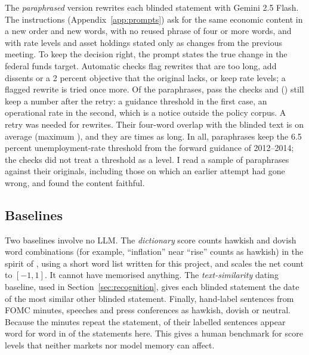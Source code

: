 The \emph{paraphrased} version rewrites each blinded statement with Gemini 2.5 Flash. The instructions
(Appendix~\ref{app:prompts}) ask for the same economic content in a new order and new words, with no
reused phrase of four or more words, and with rate levels and asset holdings stated only as changes from
the previous meeting. To keep the decision right, the prompt states the true change in the federal funds
target. Automatic checks flag rewrites that are too long, add dissents or a 2 percent objective that the
original lacks, or keep rate levels; a flagged rewrite is tried once more. Of the 
paraphrases,  pass the checks and  () still keep a
number after the retry: a guidance threshold in the first case, an operational rate in the second, which
is a notice outside the policy corpus. A retry was needed for  rewrites. Their four-word overlap with the blinded text is
 on average (maximum ), and they are  times as
long. In all,  paraphrases keep the 6.5 percent unemployment-rate threshold from the
forward guidance of 2012--2014; the checks did not treat a threshold as a level. I read a sample of
paraphrases against their originals, including those on which an earlier attempt had gone wrong, and
found the content faithful.

\subsection{Baselines}\label{sec:baselines}

Two baselines involve no LLM. The \emph{dictionary} score counts hawkish and dovish word combinations
(for example, ``inflation'' near ``rise'' counts as hawkish) in the spirit of
\citet{apel2012}, using a short word list written for this project, and scales the net count to
$[-1,1]$. It cannot have memorised anything. The \emph{text-similarity} dating baseline, used in
Section~\ref{sec:recognition}, gives each blinded statement the date of the most similar other blinded
statement. Finally, \citet{shah2023} hand-label sentences from FOMC minutes, speeches and press
conferences as hawkish, dovish or neutral. Because the minutes repeat the statement,  of
their labelled sentences appear word for word in  of the statements here. This gives a human
benchmark for score levels that neither markets nor model memory can affect.
